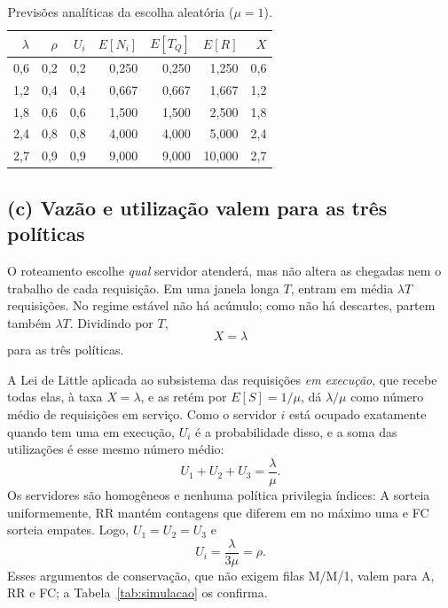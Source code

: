 \documentclass[conference,a4paper]{IEEEtran}
\begin{document}
\begin{table}[!ht]
\caption{Previsões analíticas da escolha aleatória ($\mu=1$).}
\label{tab:analitico}
\centering
\setlength{\tabcolsep}{2.4pt}
\footnotesize
\begin{tabular}{@{}rrrrrrr@{}}
\toprule
$\lambda$ & $\rho$ & $U_i$ & $E[N_i]$ & $E[T_Q]$ & $E[R]$ & $X$ \\
\midrule
0,6 & 0,2 & 0,2 & 0,250 & 0,250 & 1,250 & 0,6 \\
1,2 & 0,4 & 0,4 & 0,667 & 0,667 & 1,667 & 1,2 \\
1,8 & 0,6 & 0,6 & 1,500 & 1,500 & 2,500 & 1,8 \\
2,4 & 0,8 & 0,8 & 4,000 & 4,000 & 5,000 & 2,4 \\
2,7 & 0,9 & 0,9 & 9,000 & 9,000 & 10,000 & 2,7 \\
\bottomrule
\end{tabular}
\end{table}
\FloatBarrier

\subsection{(c) Vazão e utilização valem para as três políticas}

O roteamento escolhe \emph{qual} servidor atenderá, mas não altera as
chegadas nem o trabalho de cada requisição. Em uma janela longa $T$, entram
em média $\lambda T$ requisições. No regime estável não há acúmulo; como não
há descartes, partem também $\lambda T$. Dividindo por $T$,
\begin{equation}
 X=\lambda
 \label{eq:vazao-conservacao}
\end{equation}
para as três políticas.

A Lei de Little aplicada ao subsistema das requisições \emph{em execução},
 que recebe todas elas, à taxa $X=\lambda$, e as retém por $E[S]=1/\mu$,
dá $\lambda/\mu$ como número médio de requisições em serviço. Como o
servidor $i$ está ocupado exatamente quando tem uma em execução, $U_i$ é a
probabilidade disso, e a soma das utilizações é esse mesmo número médio:
\begin{equation}
 U_1+U_2+U_3=\frac{\lambda}{\mu}.
 \label{eq:utilizacao-agregada}
\end{equation}
Os servidores são homogêneos e nenhuma política privilegia índices: A
sorteia uniformemente, RR mantém contagens que diferem em no máximo uma e FC
sorteia empates. Logo, $U_1=U_2=U_3$ e
\begin{equation}
 U_i=\frac{\lambda}{3\mu}=\rho.
 \label{eq:utilizacao-conservacao}
\end{equation}
Esses argumentos de conservação, que não exigem filas M/M/1, valem para A,
RR e FC; a Tabela~\ref{tab:simulacao} os confirma.
\end{document}
